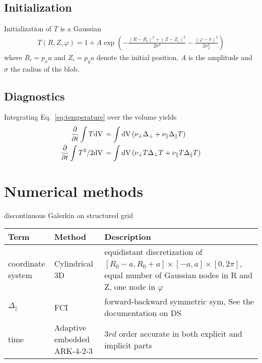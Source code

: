 \subsection{Initialization}
Initialization of $T$ is a Gaussian
\begin{align} \label{eq:initial}
  T(R,Z,\varphi) = 1 + A\exp\left(
      -\frac{(R-R_i)^2 + (Z-Z_i)^2}{2\sigma^2} - \frac{(\varphi-\pi)^2}{2\sigma_\varphi^2}\right)
\end{align}
where $R_i = p_x a$ and $Z_i = p_y a$ denote the initial position, $A$ is the amplitude and $\sigma$ the
radius of the blob.
\subsection{Diagnostics}
Integrating Eq.~\eqref{eq:temperature} over the volume yields
\begin{align}
 \frac{\partial}{\partial t} \int T \mathrm{dV}\, &=
    \int \mathrm{dV}\, ( \nu_\perp \Delta_\perp + \nu_\parallel \Delta_\parallel T) \\
 \frac{\partial}{\partial t} \int T^2/2 \mathrm{dV}\, &=
    \int \mathrm{dV}\, ( \nu_\perp T\Delta_\perp T + \nu_\parallel T\Delta_\parallel T)
\label{}
\end{align}
\section{Numerical methods}
discontinuous Galerkin on structured grid
\begin{longtable}{ll>{\RaggedRight}p{7cm}}
\toprule
\rowcolor{gray!50}\textbf{Term} &  \textbf{Method} & \textbf{Description}  \\ \midrule
coordinate system & Cylindrical 3D & equidistant discretization of $[R_0-a,R_0+a] \times [-a,a] \times [0,2\pi]$, equal number of Gaussian nodes in R and Z, one node in $\varphi$ \\
$\Delta_\parallel$ & FCI & forward-backward symmetric sym, See the documentation on DS\\
time &  Adaptive embedded ARK-4-2-3 & $3rd$ order accurate in both
explicit and implicit parts\\
\bottomrule
\end{longtable}

